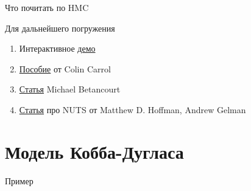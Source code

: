 \documentclass{beamer}
\begin{document}
\begin{frame}{Что почитать по HMC}
\begin{alertblock}{Для дальнейшего погружения}
\begin{enumerate}
    \item Интерактивное \href{https://chi-feng.github.io/mcmc-demo/app.html}{демо}
    \item \href{https://colindcarroll.com/2019/04/11/hamiltonian-monte-carlo-from-scratch/}{Пособие} от Colin Carrol
    \item \href{https://arxiv.org/abs/1701.02434}{Статья} Michael Betancourt
    \item \href{https://arxiv.org/abs/1111.4246}{Статья} про NUTS от Matthew D. Hoffman, Andrew Gelman
\end{enumerate}
\end{alertblock}
\end{frame}
\section{Модель Кобба-Дугласа}
\begin{frame}{}
    \centering \Huge Пример
\end{frame}
\end{document}
